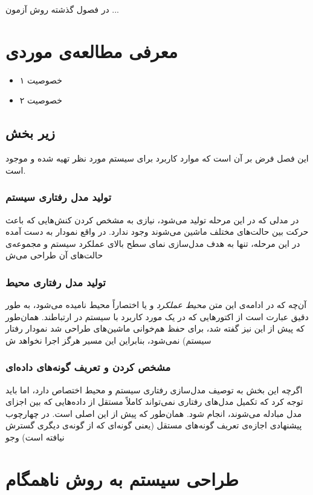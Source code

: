 در فصول گذشته روش آزمون ...

\section{معرفی مطالعه‌ی موردی }
\label{section:caseDesign}
\begin{itemize}
\item خصوصیت ۱

\item خصوصیت ۲
\end{itemize}

\subsection{زیر بخش}
 این فصل فرض بر آن است که موارد کاربرد برای سیستم مورد نظر تهیه شده و موجود است. 

\subsubsection{تولید مدل رفتاری سیستم}
در مدلی که در این مرحله تولید می‌شود، نیازی به مشخص کردن کنش‌‌هایی که باعث حرکت بین حالت‌های مختلف ماشین می‌شوند وجود ندارد. در واقع نمودار به دست آمده در این مرحله، تنها به هدف مدل‌سازی نمای سطح بالای عملکرد سیستم و مجموعه‌ی حالت‌های آن طراحی می‌ش

\subsubsection{تولید مدل رفتاری محیط}
آن‌چه که در ادامه‌ی این متن \emph{محیط عملکرد} و یا اختصاراً محیط نامیده می‌شود، به طور دقیق عبارت است از اکتورهایی که در یک مورد کاربرد با سیستم در ارتباطند. همان‌طور که پیش از این نیز گفته شد، برای حفظ هم‌خوانی ماشین‌های طراحی شد نمودار رفتار سیستم) نمی‌شود، بنابراین این مسیر هرگز اجرا نخواهد ش
\subsubsection{مشخص کردن و تعریف گونه‌های داده‌ای}
اگرچه این بخش به توصیف مدل‌سازی رفتاری سیستم و محیط اختصاص دارد، اما باید توجه کرد که تکمیل مدل‌های رفتاری نمی‌تواند کاملاً مستقل از داده‌هایی که بین اجزای مدل مبادله می‌شوند، انجام شود. همان‌طور که پیش از این  اصلی است. در چهارچوب پیشنهادی اجازه‌ی تعریف گونه‌های مستقل (یعنی گونه‌ای که از گونه‌ی دیگری گسترش نیافته است) وجو
\section{طراحی سیستم به روش ناهمگام}


